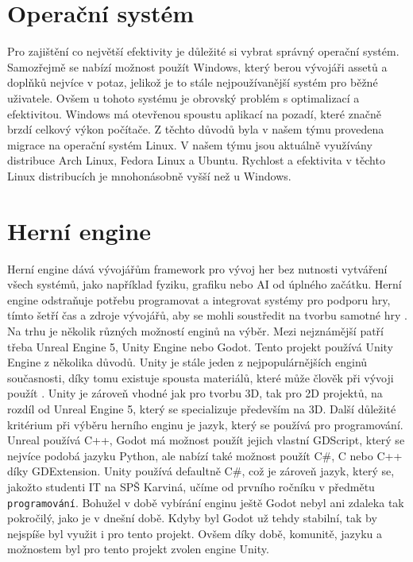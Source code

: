\section{Operační systém}

Pro zajištění co největší efektivity je důležité si vybrat správný operační systém. Samozřejmě se nabízí možnost použít Windows, který berou vývojáři assetů a doplňků nejvíce v potaz, jelikož je to stále nejpoužívanější systém pro běžné uživatele. Ovšem u tohoto systému je obrovský problém s optimalizací a efektivitou. Windows má otevřenou spoustu aplikací na pozadí, které značně brzdí celkový výkon počítače. Z těchto důvodů byla v našem týmu provedena migrace na operační systém Linux. V našem týmu jsou aktuálně využívány distribuce Arch Linux, Fedora Linux a Ubuntu. Rychlost a efektivita v těchto Linux distribucích je mnohonásobně vyšší než u Windows.

\section{Herní engine}

Herní engine dává vývojářům framework pro vývoj her bez nutnosti vytváření všech systémů, jako například fyziku, grafiku nebo AI od úplného začátku. Herní engine odstraňuje potřebu programovat a integrovat systémy pro podporu hry, tímto šetří čas a zdroje vývojářů, aby se mohli soustředit na tvorbu samotné hry \cite{game-engines-definition}. Na trhu je několik různých možností enginů na výběr. Mezi nejznámější patří třeba Unreal Engine 5, Unity Engine nebo Godot. Tento projekt používá Unity Engine z několika důvodů. Unity je stále jeden z nejpopulárnějších enginů současnosti, díky tomu existuje spousta materiálů, které může člověk při vývoji použít \cite{unity-docs}. Unity je zároveň vhodné jak pro tvorbu 3D, tak pro 2D projektů, na rozdíl od Unreal Engine 5, který se specializuje především na 3D. Další důležité kritérium při výběru herního enginu je jazyk, který se používá pro programování. Unreal používá C++, Godot má možnost použít jejich vlastní GDScript, který se nejvíce podobá jazyku Python, ale nabízí také možnost použít C\#, C nebo C++ díky GDExtension. Unity používá defaultně C\#, což je zároveň jazyk, který se, jakožto studenti IT na SPŠ Karviná, učíme od prvního ročníku v předmětu \texttt{programování}. Bohužel v době vybírání enginu ještě Godot nebyl ani zdaleka tak pokročilý, jako je v dnešní době. Kdyby byl Godot už tehdy stabilní, tak by nejspíše byl využit i pro tento projekt. Ovšem díky době, komunitě, jazyku a možnostem byl pro tento projekt zvolen engine Unity.

